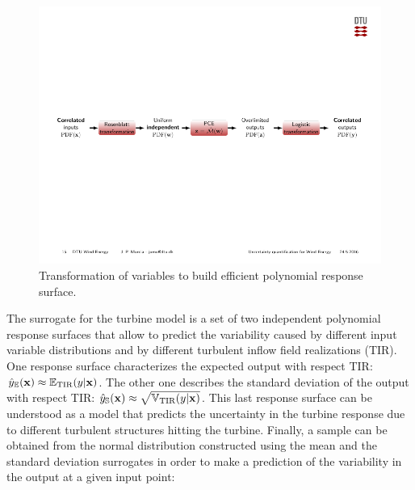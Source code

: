 \documentclass[preprint,12pt]{elsarticle}
\begin{document}

\begin{figure}[h!]
\begin{centering}
\includegraphics[width=\columnwidth]{Figures/2_transfromation_steps.pdf}
\caption{Transformation of variables to build efficient polynomial response surface.}
\label{fig_2_trans}
\end{centering}
\end{figure}

The surrogate for the turbine model is a set of two independent polynomial response surfaces that allow to predict the variability caused by different input variable distributions and by different turbulent inflow field realizations (TIR). %
One response surface characterizes the expected output with respect TIR: $\hat{y}_{\mathbb{E}}(\mathbf{x})\approx \mathbb{E}_{\text{TIR}}(y|\mathbf{x})$. The other one describes the standard deviation of the output with respect TIR: $\hat{y}_{\mathbb{S}}(\mathbf{x}) \approx \sqrt{\mathbb{V}_{\text{TIR}}(y|\mathbf{x})}$. This last response surface can be understood as a model that predicts the uncertainty in the turbine response due to different turbulent structures hitting the turbine. Finally, a sample can be obtained from the normal distribution constructed using the mean and the standard deviation surrogates in order to make a prediction of the variability in the output at a given input point:
\end{document}
